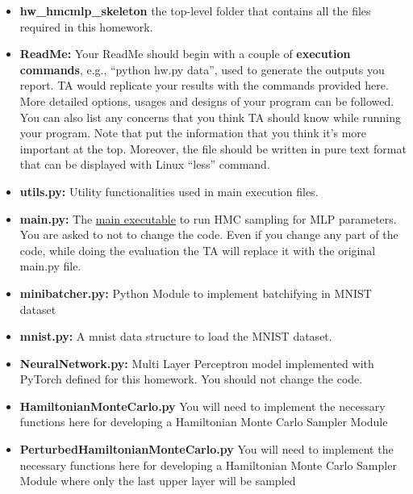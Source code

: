%
\begin{itemize}
%
\item
    \textbf{hw\homeworknumber\_hmcmlp\_skeleton}
    the top-level folder that contains all the files required in this homework.
%
\item
    \textbf{ReadMe:}
    Your ReadMe should begin with a couple of \textbf{execution commands},
    e.g., ``python hw\homeworknumber.py data'', used to generate the outputs
    you report.
    TA would replicate your results with the commands provided here.
    More detailed options, usages and designs of your program can be followed.
    You can also list any concerns that you think TA should know while running
    your program.
    Note that put the information that you think it's more important at the
    top.
    Moreover, the file should be written in pure text format that can be
    displayed with Linux ``less'' command.
    
%
\item
    \textbf{utils.py:}
    Utility functionalities used in main execution files.

\item
    \textbf{main.py:}
    The \underline{main executable} to run HMC sampling for MLP parameters. You are asked to not to change the code. Even if you change any part of the code, while doing the evaluation the TA will replace it with the original main.py file.


\item
    \textbf{minibatcher.py:}
    Python Module to implement batchifying in MNIST dataset%
\item
    \textbf{mnist.py:} A mnist data structure to load the MNIST dataset.
%
\item
    \textbf{NeuralNetwork.py:} Multi Layer Perceptron model implemented with PyTorch defined for this homework. You should not change the code.
    \item \textbf{HamiltonianMonteCarlo.py} You will need to implement the necessary functions here for developing a Hamiltonian Monte Carlo Sampler Module
    \item \textbf{PerturbedHamiltonianMonteCarlo.py} You will need to implement the necessary functions here for developing a Hamiltonian Monte Carlo Sampler Module where only the last upper layer will be sampled
    
    
%
\end{itemize}


